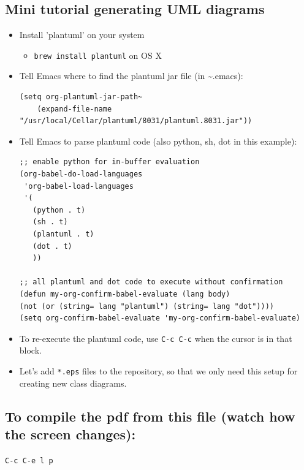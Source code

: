 \documentclass[a4paper,12pt]{article}
\begin{document}
\subsection{Mini tutorial generating UML diagrams}
\label{sec-2-1}

\begin{itemize}
\item Install 'plantuml' on your system
\begin{itemize}
\item \verb~brew install plantuml~ on OS X
\end{itemize}
\item Tell Emacs where to find the plantuml jar file (in \textasciitilde{}.emacs):
\begin{Verbatim}
(setq org-plantuml-jar-path~
    (expand-file-name "/usr/local/Cellar/plantuml/8031/plantuml.8031.jar"))
\end{Verbatim}

\item Tell Emacs to parse plantuml code (also python, sh, dot in this example):

\begin{Verbatim}
;; enable python for in-buffer evaluation
(org-babel-do-load-languages
 'org-babel-load-languages
 '(
   (python . t)
   (sh . t)
   (plantuml . t)
   (dot . t)
   ))

;; all plantuml and dot code to execute without confirmation
(defun my-org-confirm-babel-evaluate (lang body)
(not (or (string= lang "plantuml") (string= lang "dot"))))
(setq org-confirm-babel-evaluate 'my-org-confirm-babel-evaluate)
\end{Verbatim}

\item To re-execute the plantuml code, use \verb~C-c C-c~ when the cursor is in that block.

\item Let's add \verb~*.eps~ files to the repository, so that we only need this
setup for creating new class diagrams.
\end{itemize}

\subsection{To compile the pdf from this file (watch how the screen changes):}
\label{sec-2-2}
\verb~C-c C-e l p~
\end{document}

